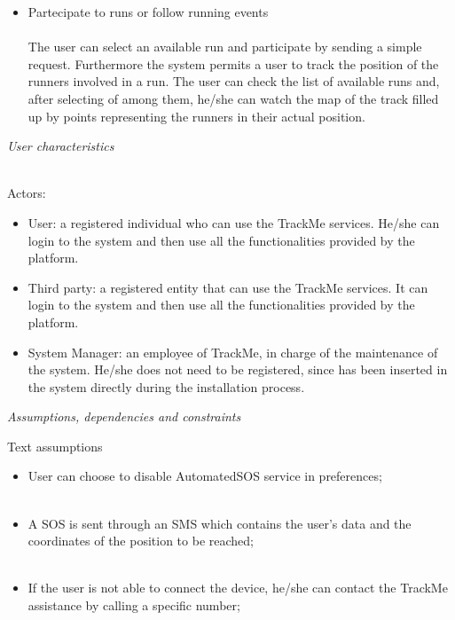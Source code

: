 \documentclass{article}
\begin{document}
\begin{legal}
\begin{legal}
{\begin{itemize}
		\item Partecipate to runs or follow running events\\\\
		The user can select an available run and participate by sending a simple request. Furthermore the system permits a user to track the position of the runners involved in a run. The user can check the list of available runs and, after selecting of among them, he/she can watch the map of the track filled up by points representing the runners in their actual position. \\
		\end{itemize}
		}
		\item \textit{User characteristics} \\\\
			{\normalfont
			Actors:\\
			\begin{itemize}
			 \item User: a registered individual who can use the TrackMe services. He/she can login to the system and then use all the functionalities provided by the platform.\\
			\item Third party: a registered entity that can use the TrackMe services. It can login to the system and then use all the functionalities provided by the platform.\\
 			\item System Manager:  an employee of TrackMe, in charge of the maintenance of the system. He/she does not need to be registered, since has been inserted in the system directly during the installation process.\\
			\end{itemize}
			}
		\item \textit{Assumptions, dependencies and constraints}\\
			\begin{legal}
    			\item Text assumptions\\
    			{\normalfont
				\begin{itemize}
					\item User can choose to disable AutomatedSOS service in preferences;\\\
					\item A SOS is sent through an SMS which contains the user's data and the coordinates of the position to be reached;\\\
					\item If the user is not able to connect the device, he/she can contact the TrackMe assistance by calling a specific number;\\

\end{itemize}}
\end{legal}
\end{legal}
\end{legal}
\end{document}
